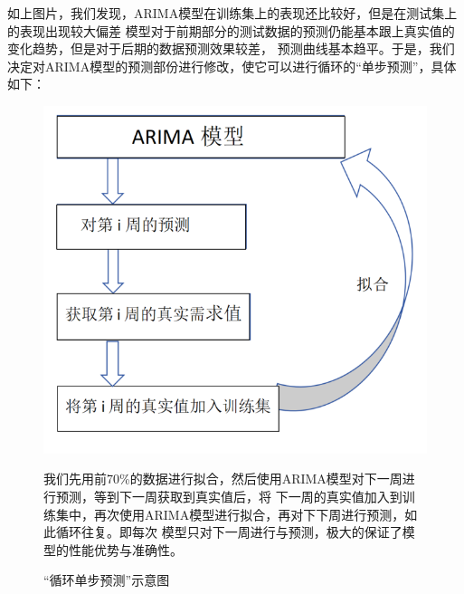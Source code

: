 \documentclass{cumcmthesis}
\begin{document}
        如上图片，我们发现，ARIMA模型在训练集上的表现还比较好，但是在测试集上的表现出现较大偏差
        模型对于前期部分的测试数据的预测仍能基本跟上真实值的变化趋势，但是对于后期的数据预测效果较差，
        预测曲线基本趋平。于是，我们决定对ARIMA模型的预测部份进行修改，使它可以进行循环的“单步预测”，具体如下：\\
        
        
        \iffalse %
        \begin{figure}[ht]
            \centering
            \begin{minipage}{0.4\textwidth}
                \includegraphics[width=\linewidth]{graph/graph_3.png}
                \caption{“循环单步预测”示意图}
                \label{fig:temp}
            \end{minipage}%
            \hfill %
            \begin{minipage}{0.55\textwidth}
                我们先用前70\%的数据进行拟合，然后使用ARIMA模型对下一周进行预测，等到下一周获取到真实值后，将
                下一周的真实值加入到训练集中，再次使用ARIMA模型进行拟合，再对下下周进行预测，如此循环往复。即每次
                模型只对下一周进行与预测，极大的保证了模型的性能优势与准确性。\\
            \end{minipage}
        \end{figure}
\end{document}
